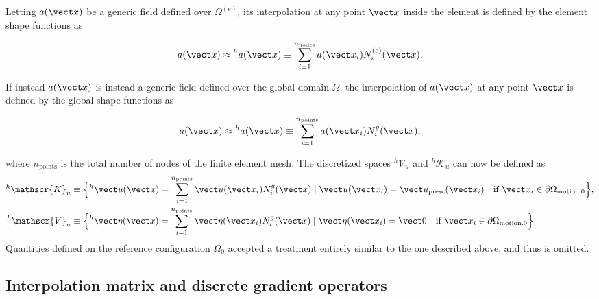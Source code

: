 Letting $a(\vect x)$ be a generic field defined over $\Omega^{(e)}$, its interpolation at any point $\vect x$ inside the element is defined by the element shape functions as
\begin{highlight}
    \begin{equation}
        a(\vect x) \approx {}^ha(\vect x) \equiv \sum_{i=1}^{n_\text{nodes}} a(\vect x_i) N_i^{(e)}(\vect x).
    \end{equation}
\end{highlight}
If instead $a(\vect x)$ is instead a generic field defined over the global domain $\Omega$, the interpolation of $a(\vect x)$ at any point $\vect x$ is defined by the global shape functions as
\begin{highlight}
    \begin{equation}
        a(\vect x) \approx {}^h a(\vect x) \equiv \sum_{i=1}^{n_\text{points}} a(\vect x_i) N_i^g(\vect x), \label{eq:interpol_global}
    \end{equation}
\end{highlight}
where $n_\text{points}$ is the total number of nodes of the finite element mesh.
The discretized spaces $^h \mathscr{V}_u$ and $^h\mathscr{K}_u$ can now be defined as
\begin{align}
    ^h \mathscr{K}_u&\equiv \Big\{\vphantom{|}^h\vect u(\vect x) = \sum_{i=1}^{n_\text{points}} \vect u(\vect x_i) N_i^g(\vect x)\;|\; \vect u(\vect x_i) = \vect u_\text{presc}(\vect x_i)\quad\text{if $\vect x_i\in \partial\Omega_\text{motion,0}$}  \Big\},\\
    ^h\mathscr{V}_u&\equiv \Big\{\vphantom{|}^h\vect \eta(\vect x) = \sum_{i=1}^{n_\text{points} } \vect \eta(\vect x_i) N_i^g(\vect x)\;|\;\vect \eta(\vect x_i)=\vect 0\quad\text{if $\vect x_i\in \partial\Omega_\text{motion,0}$}   \Big\}
\end{align}
Quantities defined on the reference configuration \(\Omega_0\) accepted a treatment entirely similar to the one described above, and thus is omitted.

\subsection{Interpolation matrix and discrete gradient operators}

